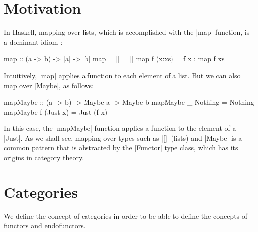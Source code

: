 \documentclass[11pt,letterpaper]{article}
\theoremstyle{definition}
\begin{document}

\section{Motivation}
\label{sec:motivation}

In Haskell, mapping over lists, which is accomplished with the |map|
function, is a dominant idiom \parencite[146]{lipovaca-2011}:
\begin{code}
map :: (a -> b) -> [a] -> [b]
map _ []     = []
map f (x:xs) = f x : map f xs
\end{code}
Intuitively, |map| applies a function to each element of a list. But
we can also map over |Maybe|, as follows:
\begin{code}
mapMaybe :: (a -> b) -> Maybe a -> Maybe b
mapMaybe _ Nothing  = Nothing
mapMaybe f (Just x) = Just (f x)
\end{code}
In this case, the |mapMaybe| function applies a function to the
element of a |Just|. As we shall see, mapping over types such as |[]|
(lists) and |Maybe| is a common pattern that is abstracted by the
|Functor| type class, which has its origins in category theory.


\section{Categories}
\label{sec:categories}

We define the concept of categories in order to be able to define the
concepts of functors and endofunctors.
\end{document}
